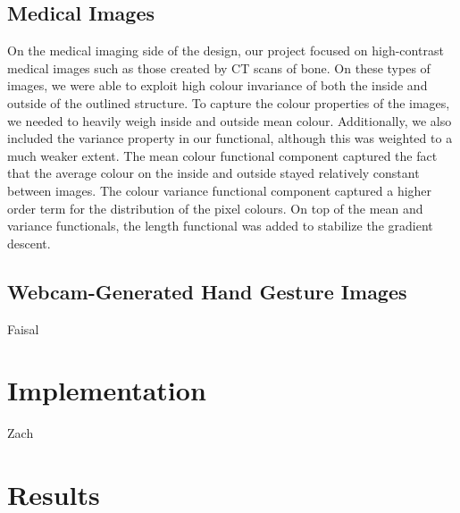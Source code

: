 \documentclass{article}
\begin{document}
		\subsection{Medical Images}
		On the medical imaging side of the design, our project focused on high-contrast medical images such as those created by CT scans of bone. On these types of images, we were able to exploit high colour invariance of both the inside and outside of the outlined structure. To capture the colour properties of the images, we needed to heavily weigh inside and outside mean colour. Additionally, we also included the variance property in our functional, although this was weighted to a much weaker extent. The mean colour functional component captured the fact that the average colour on the inside and outside stayed relatively constant between images. The colour variance functional component captured a higher order term for the distribution of the pixel colours. On top of the mean and variance functionals, the length functional was added to stabilize the gradient descent.



		\subsection{Webcam-Generated Hand Gesture Images}
			Faisal

	\section{Implementation}
		Zach

	\section{Results}
		
\end{document}

